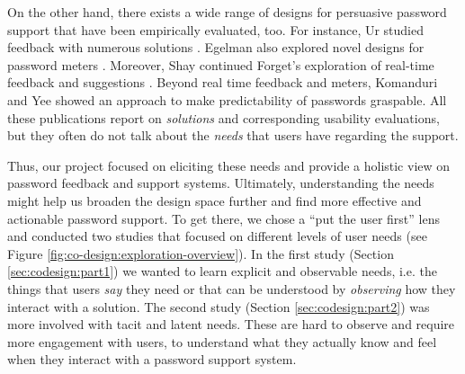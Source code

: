 On the other hand, there exists a wide range of designs for persuasive password support that have been empirically evaluated, too. For instance, Ur \etal studied feedback with numerous solutions \cite{Ur2017DataDrivenPWMeter, Ur2012HowDoesYourPasswordMeasureUp, Ur2012HelpingUsersCreateBetterPasswords}. Egelman \etal also explored novel designs for password meters \cite{Egelman2013DoesMyPasswordGoUpToEleven}. Moreover, Shay \etal continued Forget's exploration of real-time feedback and suggestions \cite{Forget2008ImprovingPasswordsThroughPersuasion, Shay2015SpoonfulOfSugar}. Beyond real time feedback and meters, Komanduri \etal \cite{Komanduri2014Telepathwords} and Yee \cite{Yee2006Passpet} showed an approach to make predictability of passwords graspable. All these publications report on \textit{solutions} and corresponding usability evaluations, but they often do not talk about the \textit{needs} that users have regarding the support.  

Thus, our project focused on eliciting these needs and provide a holistic view on password feedback and support systems. Ultimately, understanding the needs might help us broaden the design space further and find more effective and actionable password support. To get there, we chose a ``put the user first'' lens and conducted two studies that focused on different levels of user needs (see Figure \ref{fig:co-design:exploration-overview}). In the first study (Section \ref{sec:codesign:part1}) we wanted to learn explicit and observable needs, i.e. the things that users \textit{say} they need or that can be understood by \textit{observing} how they interact with a solution. 
The second study (Section \ref{sec:codesign:part2}) was more involved with tacit and latent needs. These are hard to observe and require more engagement with users, to understand what they actually know and feel when they interact with a password support system. 




